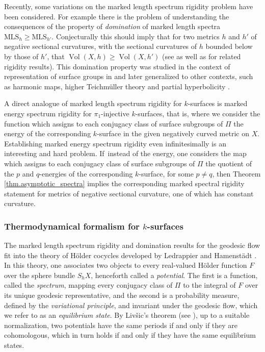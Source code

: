 \documentclass[10pt]{amsart}
\newcommand{\ksurface}{$k$\nobreakdash-surface\xspace}
\newcommand{\ksurfaces}{$k$\nobreakdash-surfaces\xspace}
\theoremstyle{plain}
\theoremstyle{definition}
\newcommand{\MLS}{\mathrm{MLS}}
\DeclareMathOperator{\Vol}{Vol}
\begin{document}
Recently, some variations on the marked length spectrum rigidity problem have been considered. For example there is the problem of understanding the consequences of the property of \emph{domination} of marked length spectra $\MLS_h\geq\MLS_{h'}$. Conjecturally this should imply that for two metrics $h$ and $h'$ of negative sectional curvatures, with the sectional curvatures of $h$ bounded below by those of $h'$, that $\Vol(X,h)\geq\Vol(X,h')$ (see \cite{Croke_Dairbekov,Croke_Dairbekov_Sharafutdinov} as well as \cite{Gogolev_Reber} for related rigidity results). This domination property was studied in the context of representation of surface groups in \cite{Deroin_Tholozan,Gueritaud_Kassel_Wolff} and later generalized to other contexts, such as harmonic maps, higher Teichmüller theory and partial hyperbolicity \cite{Alvarez_Yang,Barman_Gupta,Dai_Li,Li,Sagman}.

A direct analogue of marked length spectrum rigidity for \ksurfaces is marked energy spectrum rigidity for $\pi_1$-injective \ksurfaces, that is, where we consider the function which assigns to each conjugacy class of surface subgroups of $\Pi$ the energy of the corresponding \ksurface in the given negatively curved metric on $X$. Establishing marked energy spectrum rigidity even infinitesimally is an interesting and hard problem. If~instead of the energy, one considers the map which assigns to each conjugacy class of surface subgroups of $\Pi$ the quotient of the $p$ and $q$-energies of the corresponding \ksurface, for some $p \neq q$, then Theorem \ref{thm.asymptotic_spectra} implies the corresponding marked spectral rigidity statement for metrics of negative sectional curvature, one of which has constant curvature.

\subsubsection{Thermodynamical formalism for \protect\ksurfaces}

The marked length spectrum rigidity and domination results for the geodesic flow fit into the theory of Hölder cocycles developed by Ledrappier and Hamenstädt \cite{HamenstadtMLS,Ledrappier_bord}. In this theory, one associates two objects to every real-valued Hölder function $F$ over the sphere bundle $S_hX$, henceforth called a \emph{potential}. The first is a function, called the \emph{spectrum}, mapping every conjugacy class of $\Pi$ to the integral of $F$ over its unique geodesic representative, and the second is a probability measure, defined by the \emph{variational principle}, and invariant under the geodesic flow, which we refer to as an \emph{equilibrium state}. By Liv\v{s}ic's theorem (see \cite{Guillemin_Kazhdan,Livsic}), up to a suitable normalization, two potentials have the same periods if and only if they are cohomologous, which in turn holds if and only if they have the same equilibrium states.
\end{document}

